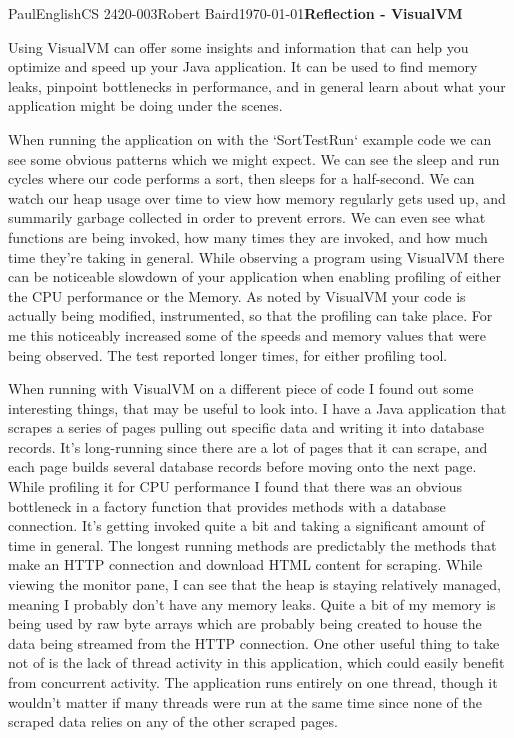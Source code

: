 \documentclass[12pt,letterpaper]{article}
\begin{document}
\begin{mla}{Paul}{English}{CS 2420-003}{Robert Baird}{\today}{\textbf{Reflection - VisualVM}}

Using VisualVM can offer some insights and information that can help you optimize and speed up your Java application. It can be used to find memory leaks, pinpoint bottlenecks in performance, and in general learn about what your application might be doing under the scenes.

When running the application on with the `SortTestRun` example code we can see some obvious patterns which we might expect. We can see the sleep and run cycles where our code performs a sort, then sleeps for a half-second. We can watch our heap usage over time to view how memory regularly gets used up, and summarily garbage collected in order to prevent errors. We can even see what functions are being invoked, how many times they are invoked, and how much time they're taking in general. While observing a program using VisualVM there can be noticeable slowdown of your application when enabling profiling of either the CPU performance or the Memory. As noted by VisualVM your code is actually being modified, instrumented, so that the profiling can take place. For me this noticeably increased some of the speeds and memory values that were being observed. The test reported longer times, for either profiling tool.

When running with VisualVM on a different piece of code I found out some interesting things, that may be useful to look into. I have a Java application that scrapes a series of pages pulling out specific data and writing it into database records. It's long-running since there are a lot of pages that it can scrape, and each page builds several database records before moving onto the next page. While profiling it for CPU performance I found that there was an obvious bottleneck in a factory function that provides methods with a database connection. It's getting invoked quite a bit and taking a significant amount of time in general. The longest running methods are predictably the methods that make an HTTP connection and download HTML content for scraping. While viewing the monitor pane, I can see that the heap is staying relatively managed, meaning I probably don't have any memory leaks. Quite a bit of my memory is being used by raw byte arrays which are probably being created to house the data being streamed from the HTTP connection. One other useful thing to take not of is the lack of thread activity in this application, which could easily benefit from concurrent activity. The application runs entirely on one thread, though it wouldn't matter if many threads were run at the same time since none of the scraped data relies on any of the other scraped pages.

\end{mla}
\end{document}
